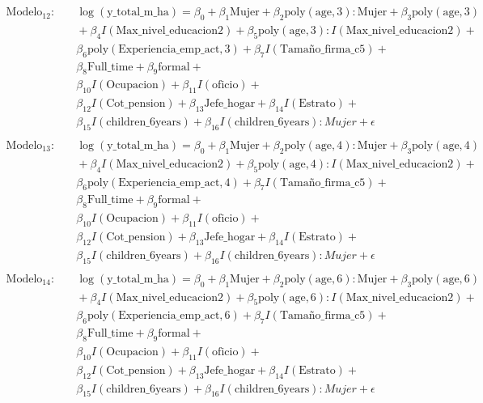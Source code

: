 \documentclass[12pt,a4paper,onecolumn]{article}
\begin{document}
\begin{align*}
\\
\text{Modelo}_{12}: & \quad \log(\text{y\_total\_m\_ha}) = \beta_0 + \beta_1 \text{Mujer} + \beta_2 \text{poly}(\text{age}, 3) : \text{Mujer} + \beta_3 \text{poly}(\text{age}, 3) \\
& \quad + \beta_4 I(\text{Max\_nivel\_educacion2}) + \beta_5 \text{poly}(\text{age}, 3) : I(\text{Max\_nivel\_educacion2}) +  \\
& \quad \beta_6 \text{poly}(\text{Experiencia\_emp\_act}, 3) + \beta_7 I(\text{Tamaño\_firma\_c5}) +  \\
& \quad \beta_8 \text{Full\_time} + \beta_9 \text{formal} +  \\
& \quad \beta_{10} I(\text{Ocupacion}) + \beta_{11} I(\text{oficio}) + \\
& \quad \beta_{12} I(\text{Cot\_pension}) + \beta_{13} \text{Jefe\_hogar} + \beta_{14} I(\text{Estrato}) + \\ & \quad \beta_{15} I(\text{children\_6years}) + \beta_{16} I(\text{children\_6years}):Mujer + \epsilon \\
\\
\text{Modelo}_{13}: & \quad \log(\text{y\_total\_m\_ha}) = \beta_0 + \beta_1 \text{Mujer} + \beta_2 \text{poly}(\text{age}, 4) : \text{Mujer} + \beta_3 \text{poly}(\text{age}, 4) \\
& \quad + \beta_4 I(\text{Max\_nivel\_educacion2}) + \beta_5 \text{poly}(\text{age}, 4) : I(\text{Max\_nivel\_educacion2}) +  \\
& \quad \beta_6 \text{poly}(\text{Experiencia\_emp\_act}, 4) + \beta_7 I(\text{Tamaño\_firma\_c5}) +  \\
& \quad \beta_8 \text{Full\_time} + \beta_9 \text{formal} +  \\
& \quad \beta_{10} I(\text{Ocupacion}) + \beta_{11} I(\text{oficio}) +  \\
& \quad \beta_{12} I(\text{Cot\_pension}) + \beta_{13} \text{Jefe\_hogar} + \beta_{14} I(\text{Estrato}) + \\ & \quad \beta_{15} I(\text{children\_6years}) + \beta_{16} I(\text{children\_6years}):Mujer + \epsilon \\
\\
\text{Modelo}_{14}: & \quad \log(\text{y\_total\_m\_ha}) = \beta_0 + \beta_1 \text{Mujer} + \beta_2 \text{poly}(\text{age}, 6) : \text{Mujer} + \beta_3 \text{poly}(\text{age}, 6) \\
& \quad + \beta_4 I(\text{Max\_nivel\_educacion2}) + \beta_5 \text{poly}(\text{age}, 6) : I(\text{Max\_nivel\_educacion2}) +  \\
& \quad \beta_6 \text{poly}(\text{Experiencia\_emp\_act}, 6) + \beta_7 I(\text{Tamaño\_firma\_c5}) +  \\
& \quad \beta_8 \text{Full\_time} + \beta_9 \text{formal} +  \\
& \quad \beta_{10} I(\text{Ocupacion}) + \beta_{11} I(\text{oficio}) +  \\
& \quad \beta_{12} I(\text{Cot\_pension}) + \beta_{13} \text{Jefe\_hogar} + \beta_{14} I(\text{Estrato}) + \\ & \quad \beta_{15} I(\text{children\_6years}) + \beta_{16}I(\text{children\_6years}):Mujer + \epsilon \\
\end{align*}
\end{document}
